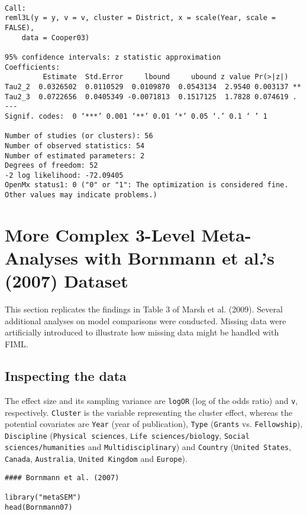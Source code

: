 \documentclass[11pt]{article}
\begin{document}
\begin{verbatim}

Call:
reml3L(y = y, v = v, cluster = District, x = scale(Year, scale = FALSE), 
    data = Cooper03)

95% confidence intervals: z statistic approximation
Coefficients:
         Estimate  Std.Error     lbound     ubound z value Pr(>|z|)   
Tau2_2  0.0326502  0.0110529  0.0109870  0.0543134  2.9540 0.003137 **
Tau2_3  0.0722656  0.0405349 -0.0071813  0.1517125  1.7828 0.074619 . 
---
Signif. codes:  0 ‘***’ 0.001 ‘**’ 0.01 ‘*’ 0.05 ‘.’ 0.1 ‘ ’ 1

Number of studies (or clusters): 56
Number of observed statistics: 54
Number of estimated parameters: 2
Degrees of freedom: 52
-2 log likelihood: -72.09405 
OpenMx status1: 0 ("0" or "1": The optimization is considered fine.
Other values may indicate problems.)
\end{verbatim}

\section{More Complex 3-Level Meta-Analyses with Bornmann et al.'s (2007) Dataset}
\label{sec:org1b53aa8}
This section replicates the findings in Table 3 of Marsh et al. (2009). Several additional analyses on model comparisons were conducted. Missing data were artificially introduced to illustrate how missing data might be handled with FIML.

\subsection{Inspecting the data}
\label{sec:orga44584d}
The effect size and its sampling variance are \texttt{logOR} (log of the odds ratio) and \texttt{v}, respectively. \texttt{Cluster} is the variable representing the cluster effect, whereas the potential covariates are \texttt{Year} (year of publication), \texttt{Type} (\texttt{Grants} vs. \texttt{Fellowship}), \texttt{Discipline} (\texttt{Physical sciences}, \texttt{Life sciences/biology}, \texttt{Social sciences/humanities} and \texttt{Multidisciplinary}) and \texttt{Country} (\texttt{United States}, \texttt{Canada}, \texttt{Australia}, \texttt{United Kingdom} and \texttt{Europe}).

\begin{verbatim}
#### Bornmann et al. (2007)

library("metaSEM")
head(Bornmann07)
\end{verbatim}
\end{document}
